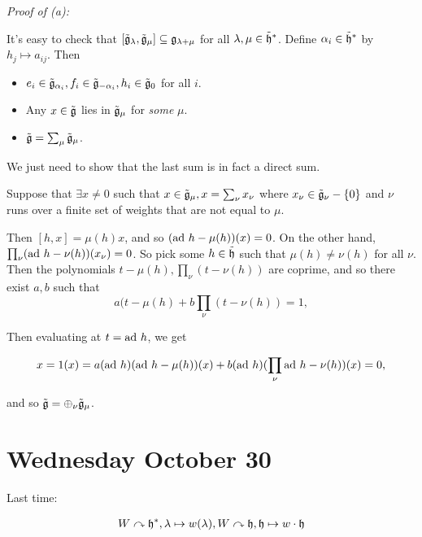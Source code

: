 \emph{Proof of (a):}

It's easy to check that
\([\tilde{{\mathfrak{g}}}_\lambda, \tilde{{\mathfrak{g}}}_\mu] \subseteq {\mathfrak{g}}_{\lambda + \mu}\)
for all \(\lambda,\mu \in \tilde{{\mathfrak{h}}}^*\). Define
\(\alpha_i \in \tilde{{\mathfrak{h}}}^*\) by \(h_j \mapsto a_{ij}\). Then

\begin{itemize}
\tightlist
\item
  \(e_i \in \tilde{{\mathfrak{g}}}_{\alpha_i}, f_i \in \tilde{{\mathfrak{g}}}_{-\alpha_i}, h_i \in\tilde{{\mathfrak{g}}}_0\)
  for all \(i\).
\item
  Any \(x\in \tilde{{\mathfrak{g}}}\) lies in \(\tilde{{\mathfrak{g}}}_\mu\) for \emph{some}
  \(\mu\).
\item
  \(\tilde{{\mathfrak{g}}} = \sum_\mu \tilde{{\mathfrak{g}}}_\mu\).
\end{itemize}

We just need to show that the last sum is in fact a direct sum.

Suppose that \(\exists x\neq 0\) such that
\(x\in \tilde{{\mathfrak{g}}}_\mu, x = \sum_\nu x_\nu\) where
\(x_\nu \in \tilde{{\mathfrak{g}}}_{\nu} - \left\{{0}\right\}\) and \(\nu\) runs over a
finite set of weights that are not equal to \(\mu\).

Then \([h, x] = \mu(h) x\), and so \((\mathrm{ad}~ h - \mu(h)) (x) = 0\). On the
other hand, \(\prod_\nu (\mathrm{ad}~ h - \nu(h)) (x_\nu) = 0\). So pick some
\(h\in\tilde{{\mathfrak{h}}}\) such that \(\mu(h) \neq \nu(h)\) for all \(\nu\).
Then the polynomials \(t - \mu(h), \prod_\nu (t - \nu(h))\) are coprime,
and so there exist \(a,b\) such that \[
a(t - \mu(h) + b \prod_\nu (t - \nu(h)) = 1, 
\]

Then evaluating at \(t= \mathrm{ad}~ h\), we get

\begin{align*}
x = 1(x) = a(\mathrm{ad}~ h) (\mathrm{ad}~ h - \mu(h))(x) + b(\mathrm{ad}~ h)(\prod_\nu \mathrm{ad}~ h - \nu(h))(x) = 0
,\end{align*}

and so \(\tilde{{\mathfrak{g}}} = \oplus_\nu \tilde{{\mathfrak{g}}}_\mu\).

\hypertarget{wednesday-october-30}{%
\section{Wednesday October 30}\label{wednesday-october-30}}

Last time:

\begin{align*}
W \curvearrowright {\mathfrak{h}}^*, \lambda \mapsto w(\lambda),
W \curvearrowright {\mathfrak{h}}, {\mathfrak{h}} \mapsto w \cdot {\mathfrak{h}}
\end{align*}

